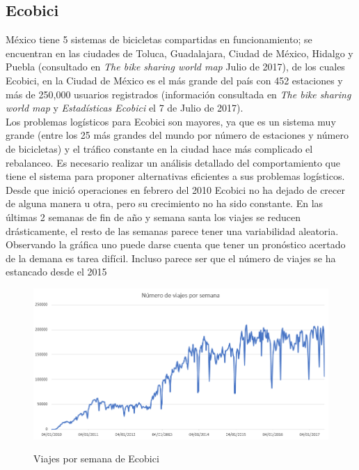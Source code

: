 \documentclass[12pt,spanish]{article}
\begin{document}
 	\subsection{Ecobici}
 	México tiene 5 sistemas de bicicletas compartidas en funcionamiento; se encuentran en las ciudades de Toluca, Guadalajara, Ciudad de México, Hidalgo y Puebla (consultado en \textit{The bike sharing world map} Julio de 2017), de los cuales Ecobici, en la Ciudad de México es el más grande del país con 452 estaciones y más de 250,000 usuarios registrados (información consultada en \textit{The bike sharing world map} y \textit{Estadísticas Ecobici} el 7 de Julio de 2017).\\
 	Los problemas logísticos para Ecobici son mayores, ya que es un sistema muy grande (entre los 25 más grandes del mundo por número de estaciones y número de bicicletas) y el tráfico constante en la ciudad hace más complicado el rebalanceo. Es necesario realizar un análisis detallado del comportamiento que tiene el sistema para proponer alternativas eficientes a sus problemas logísticos.\\
 	Desde que inició operaciones en febrero del 2010 Ecobici no ha dejado de crecer de alguna manera u otra, pero su crecimiento no ha sido constante. En las últimas 2 semanas de fin de año y semana santa los viajes se reducen drásticamente, el resto de las semanas parece tener una variabilidad aleatoria. Observando la gráfica uno puede darse cuenta que tener un pronóstico acertado de la demana es tarea difícil. Incluso parece ser que el número de viajes se ha estancado desde el 2015
 	\begin{figure}[H]
		\centering
		\includegraphics[width=15cm]{Imagenes/viajes_por_semana.png}\\
		\begin{centering}
		\caption{Viajes por semana de Ecobici}
		\end{centering}
	\end{figure}
\end{document}
